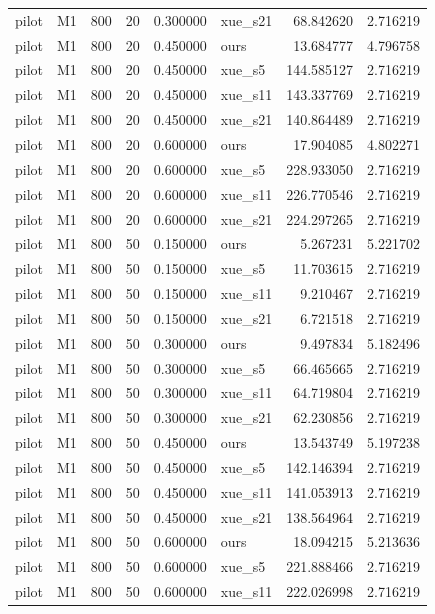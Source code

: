 \begin{longtable}{llrrrlrr}
pilot & M1 & 800 & 20 & 0.300000 & xue\_s21 & 68.842620 & 2.716219 \\
pilot & M1 & 800 & 20 & 0.450000 & ours & 13.684777 & 4.796758 \\
pilot & M1 & 800 & 20 & 0.450000 & xue\_s5 & 144.585127 & 2.716219 \\
pilot & M1 & 800 & 20 & 0.450000 & xue\_s11 & 143.337769 & 2.716219 \\
pilot & M1 & 800 & 20 & 0.450000 & xue\_s21 & 140.864489 & 2.716219 \\
pilot & M1 & 800 & 20 & 0.600000 & ours & 17.904085 & 4.802271 \\
pilot & M1 & 800 & 20 & 0.600000 & xue\_s5 & 228.933050 & 2.716219 \\
pilot & M1 & 800 & 20 & 0.600000 & xue\_s11 & 226.770546 & 2.716219 \\
pilot & M1 & 800 & 20 & 0.600000 & xue\_s21 & 224.297265 & 2.716219 \\
pilot & M1 & 800 & 50 & 0.150000 & ours & 5.267231 & 5.221702 \\
pilot & M1 & 800 & 50 & 0.150000 & xue\_s5 & 11.703615 & 2.716219 \\
pilot & M1 & 800 & 50 & 0.150000 & xue\_s11 & 9.210467 & 2.716219 \\
pilot & M1 & 800 & 50 & 0.150000 & xue\_s21 & 6.721518 & 2.716219 \\
pilot & M1 & 800 & 50 & 0.300000 & ours & 9.497834 & 5.182496 \\
pilot & M1 & 800 & 50 & 0.300000 & xue\_s5 & 66.465665 & 2.716219 \\
pilot & M1 & 800 & 50 & 0.300000 & xue\_s11 & 64.719804 & 2.716219 \\
pilot & M1 & 800 & 50 & 0.300000 & xue\_s21 & 62.230856 & 2.716219 \\
pilot & M1 & 800 & 50 & 0.450000 & ours & 13.543749 & 5.197238 \\
pilot & M1 & 800 & 50 & 0.450000 & xue\_s5 & 142.146394 & 2.716219 \\
pilot & M1 & 800 & 50 & 0.450000 & xue\_s11 & 141.053913 & 2.716219 \\
pilot & M1 & 800 & 50 & 0.450000 & xue\_s21 & 138.564964 & 2.716219 \\
pilot & M1 & 800 & 50 & 0.600000 & ours & 18.094215 & 5.213636 \\
pilot & M1 & 800 & 50 & 0.600000 & xue\_s5 & 221.888466 & 2.716219 \\
pilot & M1 & 800 & 50 & 0.600000 & xue\_s11 & 222.026998 & 2.716219 \\

\end{longtable}
